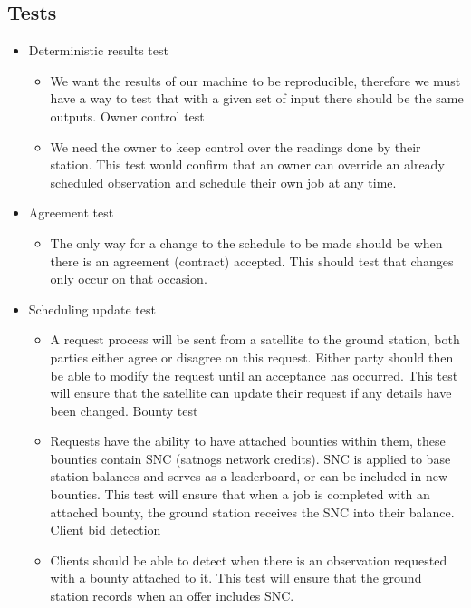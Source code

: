 \documentclass{article}
\begin{document}
\subsection{Tests}
\begin{itemize}
\item Deterministic results test
  \begin{itemize}
  \item We want the results of our machine to be reproducible, therefore we must have a way to test that with a given set of input there should be the same outputs.
Owner control test
  \item We need the owner to keep control over the readings done by their station.  This test would confirm that an owner can override an already scheduled observation and schedule their own job at any time.
  \end{itemize}

\item Agreement test
  \begin{itemize}
  \item The only way for a change to the schedule to be made should be when there is an agreement (contract) accepted. This should test that changes only occur on that occasion.
  \end{itemize}

\item Scheduling update test
  \begin{itemize}
  \item A request process will be sent from a satellite to the ground station, both parties either agree or disagree on this request. Either party should then be able to modify the request until an acceptance has occurred. This test will ensure that the satellite can update their request if any details have been changed.
Bounty test
  \item Requests have the ability to have attached bounties within them, these bounties contain SNC (satnogs network credits). SNC is applied to base station balances and serves as a leaderboard, or can be included in new bounties. This test will ensure that when a job is completed with an attached bounty, the ground station receives the SNC into their balance.
Client bid detection
  \item Clients should be able to detect when there is an observation requested with a bounty attached to it.  This test will ensure that the ground station records when an offer includes SNC.
  \end{itemize}
\end{itemize}
\end{document}
